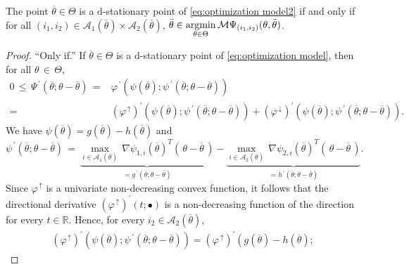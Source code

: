 \documentclass{siamart}
\begin{document}
\begin{lemma}\label{lemma: d-stationary}
The point $\overline{\theta}\in \Theta$ is a d-stationary point of \eqref{eq:optimization model2} if and only if for all
$({i}_1, {i}_2)\in \mathcal{A}_1(\bar{\theta})\times \mathcal{A}_2(\bar{\theta})$,
$\bar{\theta}\in \displaystyle\operatornamewithlimits{\mbox{argmin}}_{\theta\in \Theta} \mathcal{M}\Psi_{({i}_1, {i}_2)}(\theta,\bar{\theta})$.
\end{lemma}

\begin{proof}
``Only if.''  If $\overline{\theta}\in \Theta$ is a d-stationary point of \eqref{eq:optimization model}, then for all $\theta\,\in \, \Theta$,
\[\begin{array}{rl}
0 \,  \leq \, \Psi^{\, \prime}(\overline{\theta};\theta - \overline{\theta}) \, = &
\varphi^{\, \prime}(\psi(\overline{\theta});\psi^{\, \prime}(\overline{\theta};\theta - \overline{\theta}))
\\[0.1in]
 = & \left( \varphi^{\, \uparrow} \right)^{\prime}\left(\psi(\overline{\theta});\psi^{\, \prime}(\overline{\theta};\theta - \overline{\theta})\right)
+ \left( \varphi^{\, \downarrow} \right)^{\prime}\left(\psi(\overline{\theta});\psi^{\, \prime}(\overline{\theta};\theta - \overline{\theta})\right).
\end{array}
\]
We have $\psi(\overline{\theta}) = g(\overline{\theta}) - h(\overline{\theta})$ and
\[
\psi^{\, \prime}(\overline{\theta};\theta - \overline{\theta}) \, = \, \underbrace{\displaystyle{
\max_{i \in \mathcal{A}_1(\overline{\theta})}
} \, \nabla \psi_{1,i}(\overline{\theta})^T \left( \, \theta - \overline{\theta} \, \right)}_{\mbox{$= g^{\, \prime}(\overline{\theta};\theta - \overline{\theta})$}}
- \underbrace{\displaystyle{
\max_{i \in \mathcal{A}_2(\overline{\theta})}
} \, \nabla \psi_{2,i}(\overline{\theta})^T \left( \, \theta - \overline{\theta} \, \right)}_{\mbox{$= h^{\, \prime}(\overline{\theta};\theta - \overline{\theta})$}}.
\] %
Since $\varphi^{\, \uparrow}$ is a univariate non-decreasing convex function, it follows that the directional derivative
$\left( \varphi^{\, \uparrow} \right)^{\prime}(t;\bullet)$ is a non-decreasing function of the direction for
every $t \in \mathbb{R}$.  Hence, for every $i_2 \in \mathcal{A}_2(\overline{\theta})$,
\[ \begin{array}{l}
\left( \varphi^{\, \uparrow} \right)^{\prime}(\psi(\overline{\theta});\psi^{\, \prime}(\overline{\theta};\theta - \overline{\theta}))
 =  \left( \varphi^{\, \uparrow} \right)^{\prime}\left( g(\overline{\theta}) - h(\overline{\theta});

\end{array}\]
\end{proof}
\end{document}

